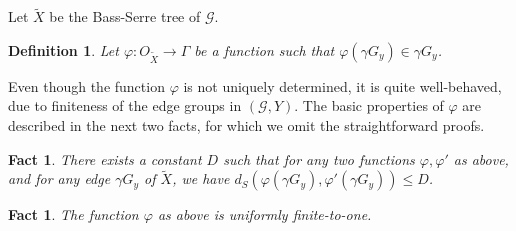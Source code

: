\documentclass[12pt, a4paper]{article}
\newcommand{\8}{\infty}
\newcommand{\abs}[1]{\left| #1 \right|}
\newcommand{\set}[1]{\left\{ #1 \right\}}
\DeclareMathOperator{\diam}{diam}
\theoremstyle{break}
\newtheorem{fact}[thm]{Fact}
\theoremstyle{defbreak}
\newtheorem{df}[thm]{Definition}
\newcommand{\wtl}[1]{\widetilde{#1}}
\begin{document}
Let $\wtl{X}$ be the Bass-Serre tree of $\mathcal{G}$.

\medskip
\begin{df}\label{Def:phi}
    Let $\varphi\colon O_{\wtl{X}}\to \Gamma$ be a function such that $\varphi(\gamma G_y) \in \gamma G_y$. 
\end{df}

Even though the function $\varphi$ is not uniquely determined, it is quite well-behaved, due to finiteness of the edge groups in $(\mathcal{G},Y)$. The basic properties of $\varphi$ are described in the next two facts, for which we omit the straightforward proofs.\medskip

\begin{fact}\label{fact:phi_phi'_close}
    There exists a constant $D$ such that for any two functions $\varphi, \varphi'$ as above, and for any edge $\gamma G_y$ of $\wtl{X}$, we have $d_S(\varphi(\gamma G_y), \varphi'(\gamma G_y)) \leqslant D$.
\end{fact}


\medskip
\begin{fact}\label{fact:phi_finite_to_one}
    The function $\varphi$ as above is uniformly finite-to-one.
\end{fact}

\end{document}
